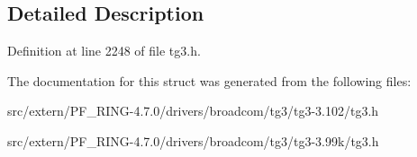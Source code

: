\subsection{Detailed Description}


Definition at line 2248 of file tg3.h.



The documentation for this struct was generated from the following files:\begin{DoxyCompactItemize}
\item 
src/extern/PF\_\-RING-\/4.7.0/drivers/broadcom/tg3/tg3-\/3.102/tg3.h\item 
src/extern/PF\_\-RING-\/4.7.0/drivers/broadcom/tg3/tg3-\/3.99k/tg3.h\end{DoxyCompactItemize}
